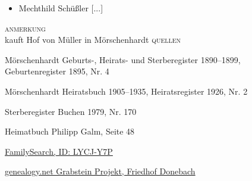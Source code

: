 \begin{person}[
    surname = {Schüßler},
    givenname = {Konstantin},
    suffix = {1895--1979},
    label = {@I171@},
    filename = {Konstantin Schuessler (1895)}
    ]
\begin{itemize}
\item Mechthild Schüßler [...]
\end{itemize}
\medbreak
\textsc{anmerkung}\\
kauft Hof von Müller in Mörschenhardt
\medbreak
\textsc{{quellen}}
\begin{enumerate}[label={[\arabic*]}]
\item Mörschenhardt Geburts-, Heirats- und Sterberegister 1890–1899, Geburtenregister 1895, Nr. 4
\item Mörschenhardt Heiratsbuch 1905–1935, Heiratsregister 1926, Nr. 2
\item Sterberegister Buchen 1979, Nr. 170
\item Heimatbuch Philipp Galm, Seite 48
\item \href{https://www.familysearch.org/tree/person/details/LYCJ-Y7P}{FamilySearch, ID: LYCJ-Y7P}
\item \href{http://grabsteine.genealogy.net/tomb.php?cem=3816&tomb=100&b=&lang=de}{genealogy.net Grabstein Projekt, Friedhof Donebach}
\end{enumerate}

\end{person}

